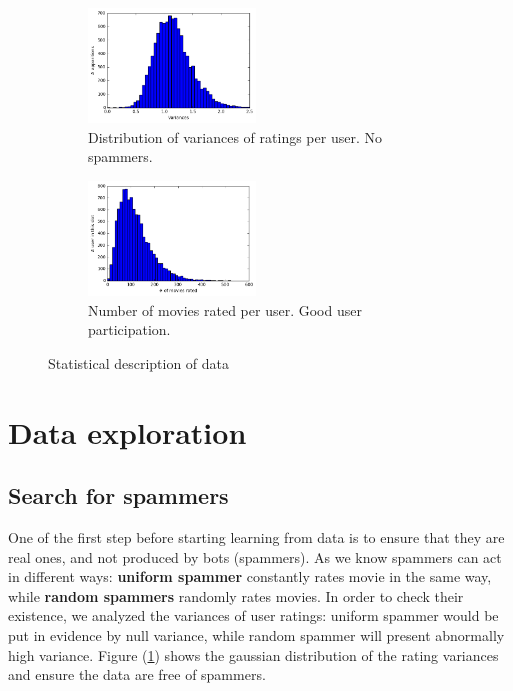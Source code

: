 \documentclass[10pt,conference,compsocconf]{IEEEtran}
\begin{document}
\begin{figure}[tbp] %
    \centering
    \hspace{-0.6cm}
    \begin{subfigure}[t]{0.45\columnwidth}
        \centering
        \includegraphics[height=1.2in]{img/Variances}
        \vspace{-3mm}
  \caption{Distribution of variances of ratings per user. No spammers.}
  \label{variances}
    \end{subfigure}%
    \hspace{0.4cm}
    \begin{subfigure}[t]{0.45\columnwidth}
        \centering
        \includegraphics[height=1.2in]{img/Ratings}
        \vspace{-3mm}
        \caption{Number of movies rated per user. Good user participation.}
        \label{number_ratings}
    \end{subfigure}
    \caption{Statistical description of data}
\end{figure}


\section{Data exploration}

\subsection{Search for spammers}

One of the first step before starting learning from data is to ensure that they are real ones, and not produced by bots (spammers). As we know spammers can act in different ways: \textbf{uniform spammer} constantly rates movie in the same way, while \textbf{random spammers} randomly rates movies. In order to check their existence, we analyzed the variances of user ratings: uniform spammer would be put in evidence by null variance, while random spammer will present abnormally high variance. Figure (\ref{variances}) shows the gaussian distribution of the rating variances and ensure the data are free of spammers.
\end{document}

